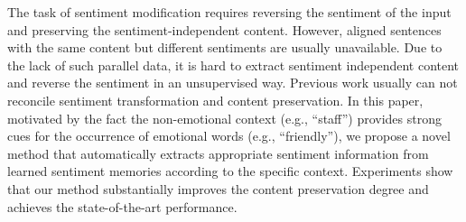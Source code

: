 The task of sentiment modification requires reversing the sentiment of the input and preserving the sentiment-independent content. However, aligned sentences with the same content but different sentiments are usually unavailable. Due to the lack of such parallel data, it is hard to extract sentiment independent content and reverse the sentiment in an unsupervised way. Previous work usually can not reconcile sentiment transformation and content preservation. In this paper, motivated by the fact the non-emotional context (e.g., ``staff'') provides strong cues for the occurrence of emotional words (e.g., ``friendly''), we propose a novel method that automatically extracts appropriate sentiment information from learned sentiment memories according to the specific context. Experiments show that our method substantially improves the content preservation degree and achieves the state-of-the-art performance.
